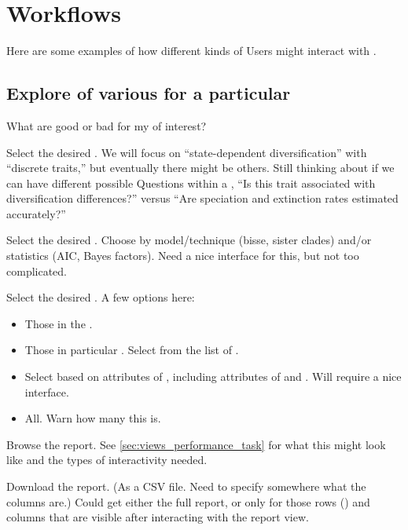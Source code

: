 \section{Workflows}

Here are some examples of how different kinds of Users might interact with \phycomb.

\subsection{Explore \Performance of various \Methods for a particular \Task}
\label{sec:workflows_task}

What \Methods are good or bad for my \Task of interest?

Select the desired \Task.
We will focus on ``state-dependent diversification'' with ``discrete traits,'' but eventually there might be others.
Still thinking about if we can have different possible Questions within a \Task, \eg ``Is this trait associated with diversification differences?'' versus ``Are speciation and extinction rates estimated accurately?''

Select the desired \Methods.
Choose by model/technique (\eg bisse, sister clades) and/or statistics (\eg AIC, Bayes factors).
Need a nice interface for this, but not too complicated.

Select the desired \Elements.
A few options here:
\begin{itemize}
    \item Those in the \Benchmark.
    \item Those in particular \Refsets.  Select from the list of \Refsets.
    \item Select based on attributes of \Elements, including attributes of \Trees and \Traits.  Will require a nice interface.
    \item All.  Warn how many this is.
\end{itemize}

Browse the \Performance report.
See \cref{sec:views_performance_task} for what this might look like and the types of interactivity needed.

Download the \Performance report.
(As a CSV file.  Need to specify somewhere what the columns are.)
Could get either the full report, or only for those rows (\Elements) and columns that are visible after interacting with the report view.

